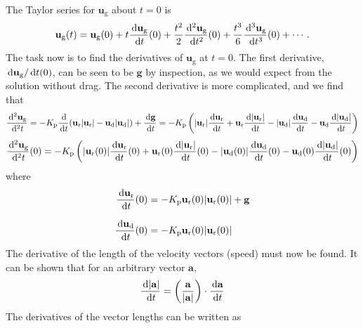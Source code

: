 The Taylor series for $\mathbf{u}_\text{g}$ about $t = 0$ is
\begin{align}
    \mathbf{u}_\text{g}(t) = \mathbf{u}_\text{g}(0) + t \frac{\,\mathrm{d} \mathbf{u}_\text{g}}{\,\mathrm{d} t}(0) + \frac{t^2}{2} \frac{\,\mathrm{d}^2 \mathbf{u}_\text{g}}{\,\mathrm{d} t^2}(0) + \frac{t^3}{6} \frac{\,\mathrm{d}^3 \mathbf{u}_\text{g}}{\,\mathrm{d} t^3}(0) + \cdots \,.
\end{align}
The task now is to find the derivatives of $\mathbf{u}_\text{g}$ at $t = 0$. The first derivative, $\,\mathrm{d} \mathbf{u}_\text{g} / \,\mathrm{d} t(0)$, can be seen to be $\mathbf{g}$ by inspection, as we would expect from the solution without drag. The second derivative is more complicated, and we find that
\begin{align*}
    \frac{\,\mathrm{d}^2 \mathbf{u}_\text{g}}{\,\mathrm{d}^2 t} = -K_{\rm p} \frac{\,\mathrm{d}}{\,\mathrm{d} t}(\mathbf{u}_\text{r} |\mathbf{u}_\text{r}| - \mathbf{u}_\text{d} |\mathbf{u}_\text{d}|) + \frac{\,\mathrm{d} \mathbf{g}}{\,\mathrm{d} t} = -K_{\rm p} \left(|\mathbf{u}_\text{r}| \frac{\,\mathrm{d} \mathbf{u}_\text{r}}{\,\mathrm{d} t} + \mathbf{u}_\text{r} \frac{\,\mathrm{d} |\mathbf{u}_\text{r}|}{\,\mathrm{d} t} - |\mathbf{u}_\text{d}| \frac{\,\mathrm{d} \mathbf{u}_\text{d}}{\,\mathrm{d} t} - \mathbf{u}_\text{d} \frac{\,\mathrm{d} |\mathbf{u}_\text{d}|}{\,\mathrm{d} t}\right)
\end{align*}
\begin{align}
    \frac{\,\mathrm{d}^2 \mathbf{u}_\text{g}}{\,\mathrm{d}^2 t}(0) = -K_{\rm p} \left(|\mathbf{u}_\text{r}(0)| \frac{\,\mathrm{d} \mathbf{u}_\text{r}}{\,\mathrm{d} t}(0) + \mathbf{u}_\text{r}(0) \frac{\,\mathrm{d} |\mathbf{u}_\text{r}|}{\,\mathrm{d} t}(0) - |\mathbf{u}_\text{d}(0)| \frac{\,\mathrm{d} \mathbf{u}_\text{d}}{\,\mathrm{d} t}(0) - \mathbf{u}_\text{d}(0) \frac{\,\mathrm{d} |\mathbf{u}_\text{d}|}{\,\mathrm{d} t}(0)\right)
\end{align}
where
\begin{align*}
    \frac{\,\mathrm{d} \mathbf{u}_\text{r}}{\,\mathrm{d} t}(0) &= -K_{\rm p} \mathbf{u}_{\text{r}}(0) |\mathbf{u}_{\text{r}}(0)| + \mathbf{g}  \\[.1in]
    \frac{\,\mathrm{d} \mathbf{u}_\text{d}}{\,\mathrm{d} t}(0) &= -K_{\rm p} \mathbf{u}_{\text{r}}(0) |\mathbf{u}_{\text{r}}(0)|
\end{align*}
The derivative of the length of the velocity vectors (speed) must now be found. It can be shown that for an arbitrary vector $\mathbf{a}$,
\begin{align*}
    \frac{\,\mathrm{d} |\mathbf{a}|}{\,\mathrm{d} t} = \left(\frac{\mathbf{a}}{|\mathbf{a}|}\right) \cdot \frac{\,\mathrm{d} \mathbf{a}}{\,\mathrm{d} t}
\end{align*}
The derivatives of the vector lengths can be written as
